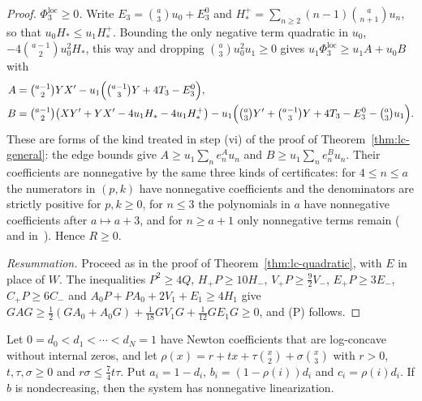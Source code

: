 \begin{proof}
\emph{$\Phi^{\mathrm{loc}}_3\geq0$.} Write $E_3=\binom a3u_0+E_3^0$ and $H_*^+=\sum_{n\geq2}(n-1)\binom a{n+1}u_n$, so that $u_0H_*\leq u_1H_*^+$. Bounding the only negative term quadratic in $u_0$, $-4\binom{a-1}2u_0^2H_*$, this way and dropping $\binom a3u_0^2u_1\geq0$ gives $u_1\Phi^{\mathrm{loc}}_3\geq u_1A+u_0B$ with
\[
\begin{aligned}
A&=\tbinom{a-1}2YX'-u_1\Bigl(\tbinom{a-1}3Y+4T_3-E^0_3\Bigr),\\
B&=\tbinom{a-1}2\bigl(XY'+YX'-4u_1H_*-4u_1H_*^+\bigr)-u_1\Bigl(\tbinom a3Y'+\tbinom{a-1}3Y+4T_3-E^0_3-\tbinom a3u_1\Bigr).
\end{aligned}
\]
These are forms of the kind treated in step (vi) of the proof of Theorem~\ref{thm:lc-general}: the edge bounds give $A\geq u_1\sum_ne^A_nu_n$ and $B\geq u_1\sum_ne^B_nu_n$. Their coefficients are nonnegative by the same three kinds of certificates: for $4\leq n\leq a$ the numerators in $(p,k)$ have nonnegative coefficients and the denominators are strictly positive for $p,k\geq0$, for $n\leq3$ the polynomials in $a$ have nonnegative coefficients after $a\mapsto a+3$, and for $n\geq a+1$ only nonnegative terms remain ( and  in~\cite{code}). Hence $R\geq0$.

\emph{Resummation.} Proceed as in the proof of Theorem~\ref{thm:lc-quadratic}, with $E$ in place of $W$. The inequalities $P^2\geq4Q$, $H_+P\geq10H_-$, $V_+P\geq\frac92V_-$, $E_+P\geq3E_-$, $C_+P\geq6C_-$ and $A_0P+PA_0+2V_1+E_1\geq4H_1$ give $GAG\geq\frac12(GA_0+A_0G)+\frac1{18}GV_1G+\frac1{12}GE_1G\geq0$, and (P) follows.
\end{proof}

\begin{corollary}\label{cor:cubic74}
Let $0=d_0<d_1<\cdots<d_N=1$ have Newton coefficients that are log-concave without internal zeros, and let $\rho(x)=r+tx+\tau\binom x2+\sigma\binom x3$ with $r>0$, $t,\tau,\sigma\geq0$ and $r\sigma\leq\frac74t\tau$. Put $a_i=1-d_i$, $b_i=(1-\rho(i))d_i$ and $c_i=\rho(i)d_i$. If $b$ is nondecreasing, then the system has nonnegative linearization.
\end{corollary}

